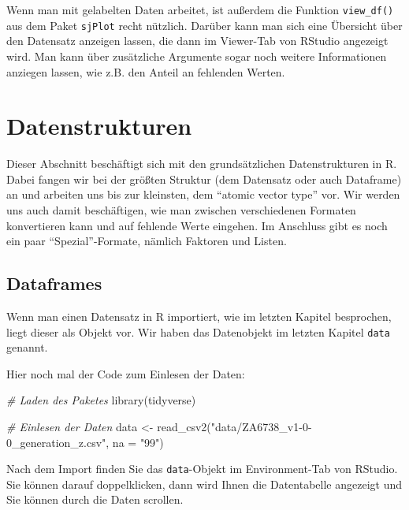 \documentclass[
]{book}
\newenvironment{Shaded}{\begin{snugshade}}{\end{snugshade}}
\newcommand{\AttributeTok}[1]{\textcolor[rgb]{0.77,0.63,0.00}{#1}}
\newcommand{\CommentTok}[1]{\textcolor[rgb]{0.56,0.35,0.01}{\textit{#1}}}
\newcommand{\FunctionTok}[1]{\textcolor[rgb]{0.00,0.00,0.00}{#1}}
\newcommand{\NormalTok}[1]{#1}
\newcommand{\OtherTok}[1]{\textcolor[rgb]{0.56,0.35,0.01}{#1}}
\newcommand{\StringTok}[1]{\textcolor[rgb]{0.31,0.60,0.02}{#1}}
\begin{document}
Wenn man mit gelabelten Daten arbeitet, ist außerdem die Funktion \texttt{view\_df()} aus dem Paket \texttt{sjPlot} recht nützlich. Darüber kann man sich eine Übersicht über den Datensatz anzeigen lassen, die dann im Viewer-Tab von RStudio angezeigt wird. Man kann über zusätzliche Argumente sogar noch weitere Informationen anziegen lassen, wie z.B. den Anteil an fehlenden Werten.

\hypertarget{datenstrukturen}{%
\section{Datenstrukturen}\label{datenstrukturen}}

Dieser Abschnitt beschäftigt sich mit den grundsätzlichen Datenstrukturen in R. Dabei fangen wir bei der größten Struktur (dem Datensatz oder auch Dataframe) an und arbeiten uns bis zur kleinsten, dem ``atomic vector type'' vor. Wir werden uns auch damit beschäftigen, wie man zwischen verschiedenen Formaten konvertieren kann und auf fehlende Werte eingehen. Im Anschluss gibt es noch ein paar ``Spezial''-Formate, nämlich Faktoren und Listen.

\hypertarget{dataframes}{%
\subsection{Dataframes}\label{dataframes}}

Wenn man einen Datensatz in R importiert, wie im letzten Kapitel besprochen, liegt dieser als Objekt vor. Wir haben das Datenobjekt im letzten Kapitel \texttt{data} genannt.

Hier noch mal der Code zum Einlesen der Daten:

\begin{Shaded}
\begin{Highlighting}[]
\CommentTok{\# Laden des Paketes}
\FunctionTok{library}\NormalTok{(tidyverse)}

\CommentTok{\# Einlesen der Daten}
\NormalTok{data }\OtherTok{\textless{}{-}} \FunctionTok{read\_csv2}\NormalTok{(}\StringTok{"data/ZA6738\_v1{-}0{-}0\_generation\_z.csv"}\NormalTok{, }\AttributeTok{na =} \StringTok{"99"}\NormalTok{)}
\end{Highlighting}
\end{Shaded}

Nach dem Import finden Sie das \texttt{data}-Objekt im Environment-Tab von RStudio. Sie können darauf doppelklicken, dann wird Ihnen die Datentabelle angezeigt und Sie können durch die Daten scrollen.
\end{document}
